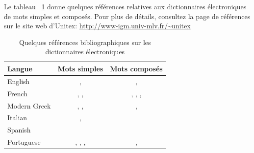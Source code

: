 Le tableau ~\ref{ref-dicos} donne quelques références relatives aux dictionnaires électroniques de
mots simples et composés. Pour plus de détails, consultez la page de références sur le site
web d’Unitex: \url{http://www-igm.univ-mlv.fr/~unitex}

\bigskip
\begin{table}[!h]
\begin{center}
\begin{tabular}{|l|c|c|}
\hline
\textbf{Langue} & \textbf{Mots simples} & \textbf{Mots composés} \\
\hline
English & \cite{klarsfeld}, \cite{monceaux-1995} & \cite{delac-anglais},
\cite{these-Savary} \\
\hline
French & \cite{formes-ambigues}, \cite{dicos-francais}, \cite{jacques-1995} & \cite{dicos-francais},
\cite{Gross96},
\cite{max-1993},
\cite{syntaxe-de-ladverbe} \\
\hline
Modern Greek & \cite{modern-greek}, \cite{matthieu-anastasia}, \cite{these-tita} & \cite{tita-2002},
\cite{anastasia-2002} \\
\hline
Italian & \cite{delaf-italien}, \cite{delaf-italien-book} & \cite{composes-italien} \\
\hline
Spanish & \cite{blanco-2000} & \cite{blanco-1997} \\
\hline
Portuguese & \cite{eleuterio1995}, \cite{ranchhod1996b}, \cite{ranchhodd1998},
\cite{muniz2005} & \cite{ranchhod1991}, \cite{ranchhodd1998} \\
\hline
\end{tabular}
\caption{Quelques références bibliographiques sur les dictionnaires électroniques\label{ref-dicos}}
\end{center}
\end{table}
